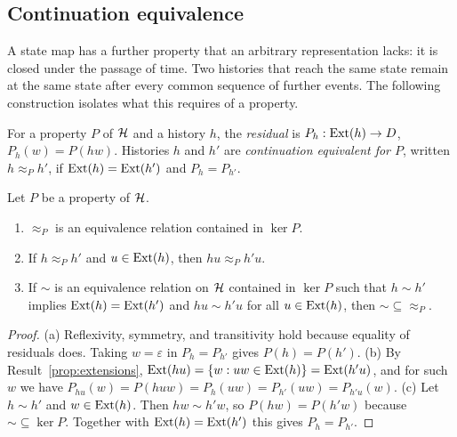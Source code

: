 \subsection*{Continuation equivalence}

A state map has a further property that an arbitrary representation lacks: it is closed under the passage of time. Two histories that reach the same state remain at the same state after every common sequence of further events. The following construction isolates what this requires of a property.

\begin{definition}\label{def:continuation-equiv}
For a property $P$ of $\mathcal{H}$ and a history $h$, the \emph{residual} is $P_h:\operatorname{Ext}(h)\to D$, $P_h(w)=P(hw)$. Histories $h$ and $h'$ are \emph{continuation equivalent for $P$}, written $h\approx_P h'$, if $\operatorname{Ext}(h)=\operatorname{Ext}(h')$ and $P_h=P_{h'}$.
\end{definition}

\begin{established}\label{prop:nerode}
Let $P$ be a property of $\mathcal{H}$.
\begin{enumerate}[nosep,label=(\alph*)]
  \item $\approx_P$ is an equivalence relation contained in $\ker P$.
  \item If $h\approx_P h'$ and $u\in\operatorname{Ext}(h)$, then $hu\approx_P h'u$.
  \item If $\sim$ is an equivalence relation on $\mathcal{H}$ contained in $\ker P$ such that $h\sim h'$ implies $\operatorname{Ext}(h)=\operatorname{Ext}(h')$ and $hu\sim h'u$ for all $u\in\operatorname{Ext}(h)$, then ${\sim}\subseteq{\approx_P}$.
\end{enumerate}
\end{established}
\begin{proof}
(a) Reflexivity, symmetry, and transitivity hold because equality of residuals does. Taking $w=\varepsilon$ in $P_h=P_{h'}$ gives $P(h)=P(h')$. (b) By Result~\ref{prop:extensions}, $\operatorname{Ext}(hu)=\{w: uw\in\operatorname{Ext}(h)\}=\operatorname{Ext}(h'u)$, and for such $w$ we have $P_{hu}(w)=P(huw)=P_h(uw)=P_{h'}(uw)=P_{h'u}(w)$. (c) Let $h\sim h'$ and $w\in\operatorname{Ext}(h)$. Then $hw\sim h'w$, so $P(hw)=P(h'w)$ because ${\sim}\subseteq\ker P$. Together with $\operatorname{Ext}(h)=\operatorname{Ext}(h')$ this gives $P_h=P_{h'}$.
\end{proof}

